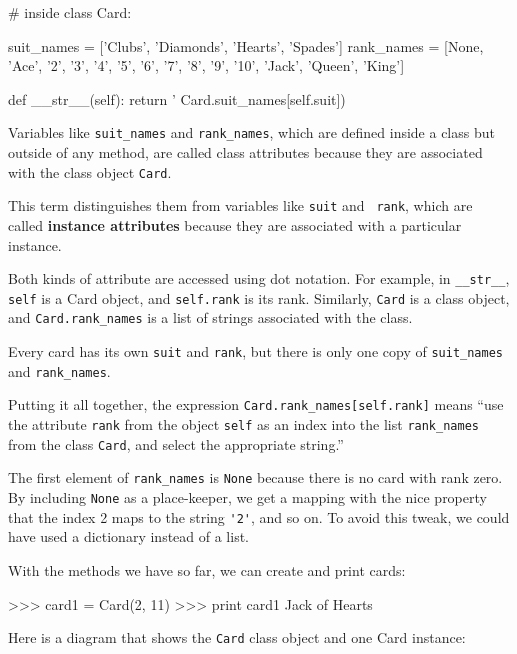 \beforeverb
\begin{pycode}
# inside class Card:

    suit_names = ['Clubs', 'Diamonds', 'Hearts', 'Spades']
    rank_names = [None, 'Ace', '2', '3', '4', '5', '6', '7', 
              '8', '9', '10', 'Jack', 'Queen', 'King']

    def __str__(self):
        return '%
                             Card.suit_names[self.suit])
\end{pycode}
\afterverb
%
Variables like \verb"suit_names" and \verb"rank_names", which are
defined inside a class but outside of any method, are called
class attributes because they are associated with the class object 
{\tt Card}.


This term distinguishes them from variables like {\tt suit} and {\tt
  rank}, which are called {\bf instance attributes} because they are
associated with a particular instance.


Both kinds of attribute are accessed using dot notation.  For
example, in \verb"__str__", {\tt self} is a Card object,
and {\tt self.rank} is its rank.  Similarly, {\tt Card}
is a class object, and \verb"Card.rank_names" is a
list of strings associated with the class.

Every card has its own {\tt suit} and {\tt rank}, but there
is only one copy of \verb"suit_names" and \verb"rank_names".

Putting it all together, the expression
\verb"Card.rank_names[self.rank]" means ``use the attribute {\tt rank}
from the object {\tt self} as an index into the list \verb"rank_names"
from the class {\tt Card}, and select the appropriate string.''

The first element of \verb"rank_names" is {\tt None} because there
is no card with rank zero.  By including {\tt None} as a place-keeper,
we get a mapping with the nice property that the index 2 maps to the
string \verb"'2'", and so on.  To avoid this tweak, we could have
used a dictionary instead of a list.

With the methods we have so far, we can create and print cards:

\beforeverb
\begin{pyinterpreter}
>>> card1 = Card(2, 11)
>>> print card1
Jack of Hearts
\end{pyinterpreter}
\afterverb
%
Here is a diagram that shows the {\tt Card} class object
and one Card instance:


